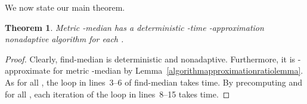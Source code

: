 \documentclass[letterpaper,12pt]{article}
\newtheorem{theorem}{Theorem}
\newcommand{\comment}[1]{}
\begin{document}
We now state our main theorem.

\begin{theorem}
{\sc Metric -median} has a
deterministic
-time
-approximation
nonadaptive
algorithm for each
.
\end{theorem}
\begin{proof}
Clearly, {\sf find-median} is deterministic and nonadaptive.
Furthermore, it is -approximate for {\sc metric -median}
by Lemma~\ref{algorithmapproximationratiolemma}.
As  for all ,
the loop in lines~3--6 of {\sf find-median} takes  time.
By precomputing  and  for all
, each iteration of the loop in lines~8--15
takes  time.
\end{proof}


\comment{ By equation~(\ref{pseudodistance}),

for all .








Define

to be
the -ary representation of .
For ,
{\small 
}Clearly,  is the set of -ary representations of the numbers in
.





}




\noindent
\end{document}
